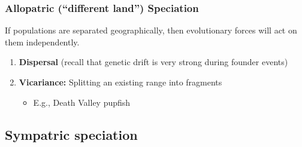 \begin{frame}[t]
    \frametitle{Allopatric (``different land'') Speciation}
    \vspace{-4mm}
    \begin{adjustwidth}{-2em}{-1.5em}
        If populations are separated geographically, then evolutionary forces
        will act on them independently.
        \begin{enumerate}
            \item \textbf{Dispersal} (recall that genetic drift is very strong during
                founder events)
            \item \textbf{Vicariance:} Splitting an existing range into fragments
                \begin{itemize}
                    \item E.g., Death Valley pupfish
                \end{itemize}
        \end{enumerate}
    \end{adjustwidth}

\end{frame}


\subsection{Sympatric speciation}

